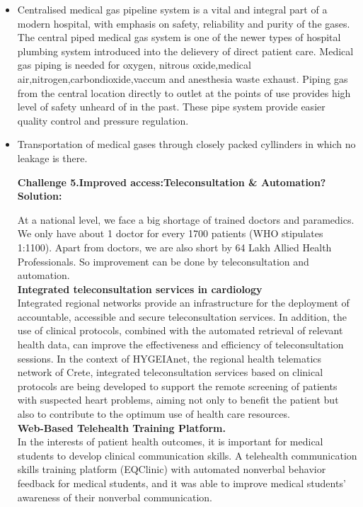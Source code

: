 \documentclass[12]{article}
\begin{document}
		 		\begin{itemize}
		 			\item 	Centralised medical gas pipeline system is a vital and integral part of a modern hospital, with emphasis on safety,	reliability and purity of the gases.
		 			The central piped medical gas system is one of the newer types of hospital plumbing system  introduced into the delievery of direct patient care.
		 			Medical gas piping is needed for oxygen, nitrous oxide,medical air,nitrogen,carbondioxide,vaccum and anesthesia waste exhaust.
		 			Piping gas from the central location directly to outlet at the points of use provides high level of safety unheard of in the past.
		 			These pipe system provide easier quality control and pressure regulation.
		 			\item Transportation of medical gases through closely packed cyllinders in which no leakage is there.
		 		\begin{flushleft}
		 		\textbf{Challenge 5.Improved access:Teleconsultation & Automation?}\\
		 			\textbf{Solution:}	
		 		\end{flushleft}
		 		At a national level, we face a big shortage of trained doctors and paramedics. We only have about 1 doctor for every 1700 patients (WHO stipulates 1:1100). Apart from doctors, we are also short by 64 Lakh Allied Health Professionals. So improvement can be done by teleconsultation and automation.\\
		 		\textbf{Integrated teleconsultation services in cardiology\\}
		 		Integrated regional networks provide an infrastructure for the deployment of accountable, accessible and secure teleconsultation services. In addition, the use of clinical protocols, combined with the automated retrieval of relevant health data, can improve the effectiveness and efficiency of teleconsultation sessions. In the context of HYGEIAnet, the regional health telematics network of Crete, integrated teleconsultation services based on clinical protocols are being developed to support the remote screening of patients with suspected heart problems, aiming not only to benefit the patient but also to contribute to the optimum use of health care resources.\\
		 		\textbf{Web-Based Telehealth Training Platform.\\}
		 		In the interests of patient health outcomes, it is important for medical students to develop clinical communication skills. A telehealth communication skills training platform (EQClinic) with automated nonverbal behavior feedback for medical students, and it was able to improve medical students’ awareness of their nonverbal communication.
		 		

\end{itemize}
\end{document}
